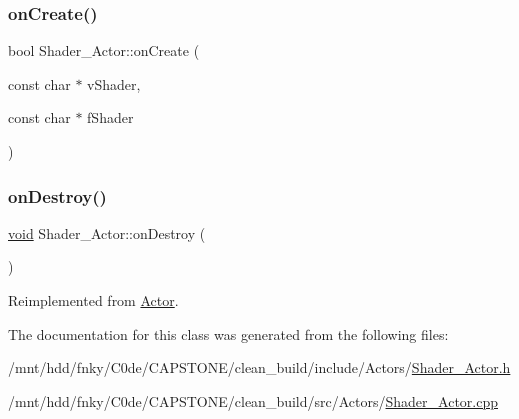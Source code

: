 \subsubsection{\texorpdfstring{on\+Create()}{onCreate()}}
{\footnotesize\ttfamily bool Shader\+\_\+\+Actor\+::on\+Create (\begin{DoxyParamCaption}\item[{const char $\ast$}]{v\+Shader,  }\item[{const char $\ast$}]{f\+Shader }\end{DoxyParamCaption})}

\mbox{\label{classShader__Actor_a16f7f5f30d3f3cd125de9713457a7db2}} 
\subsubsection{\texorpdfstring{on\+Destroy()}{onDestroy()}}
{\footnotesize\ttfamily \hyperlink{imgui__impl__opengl3__loader_8h_ac668e7cffd9e2e9cfee428b9b2f34fa7}{void} Shader\+\_\+\+Actor\+::on\+Destroy (\begin{DoxyParamCaption}{ }\end{DoxyParamCaption})\hspace{0.3cm}{\ttfamily [virtual]}}



Reimplemented from \hyperlink{classActor_a47101d6275509662bf6c84c3f3439696}{Actor}.



The documentation for this class was generated from the following files\+:\begin{DoxyCompactItemize}
\item 
/mnt/hdd/fnky/\+C0de/\+C\+A\+P\+S\+T\+O\+N\+E/clean\+\_\+build/include/\+Actors/\hyperlink{Shader__Actor_8h}{Shader\+\_\+\+Actor.\+h}\item 
/mnt/hdd/fnky/\+C0de/\+C\+A\+P\+S\+T\+O\+N\+E/clean\+\_\+build/src/\+Actors/\hyperlink{Shader__Actor_8cpp}{Shader\+\_\+\+Actor.\+cpp}\end{DoxyCompactItemize}
